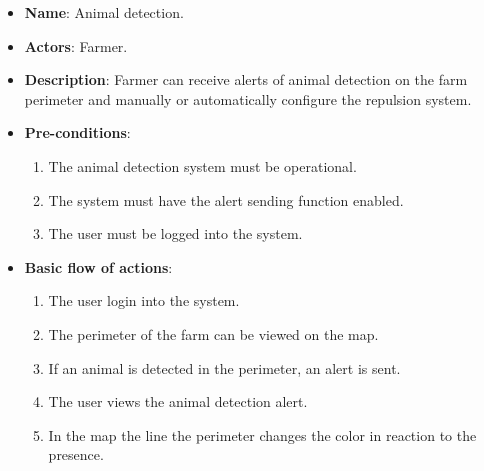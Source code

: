\begin{itemize}
    \item \textbf{Name}: Animal detection.
    \item \textbf{Actors}: Farmer.
    \item \textbf{Description}: Farmer can receive alerts of animal detection on the farm perimeter and manually or automatically configure the repulsion system.
    \item \textbf{Pre-conditions}:
        \begin{enumerate}
            \item The animal detection system must be operational.
            \item The system must have the alert sending function enabled.
            \item The user must be logged into the system.
        \end{enumerate}
    \item \textbf{Basic flow of actions}:
        \begin{enumerate}
            \item The user login into the system.
            \item The perimeter of the farm can be viewed on the map.
            \item If an animal is detected in the perimeter, an alert is sent.
            \item The user views the animal detection alert.
            \item In the map the line the perimeter changes the color in reaction to the presence.
        \end{enumerate}
\end{itemize}

